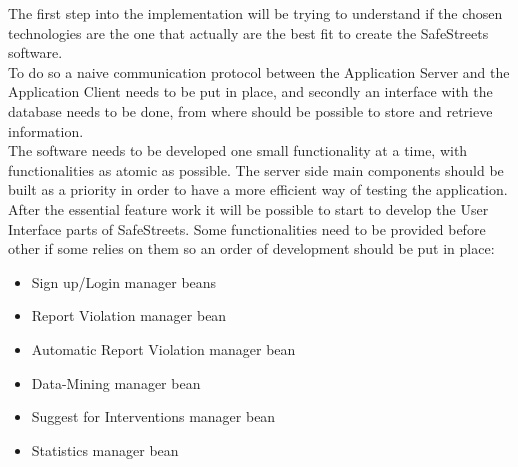 The first step into the implementation will be trying to understand if the chosen technologies are the one that actually are the best fit to create the SafeStreets software.
\\To do so a naive communication protocol between the Application Server and the Application Client needs to be put in place, and secondly an interface with the database needs to be done, from where should be possible to store and retrieve information.
\\The software needs to be developed one small functionality at a time, with functionalities as atomic as possible. The server side main components should be built as a priority in order to have a more efficient way of testing the application.
\\After the essential feature work it will be possible to start to develop the User Interface parts of SafeStreets.
Some functionalities need to be provided before other if some relies on them so an order of development should be put in place: 
\begin{itemize}
\item Sign up/Login manager beans
\item Report Violation manager bean
\item Automatic Report Violation manager bean
\item Data-Mining manager bean
\item Suggest for Interventions manager bean
\item Statistics manager bean
\end{itemize}

